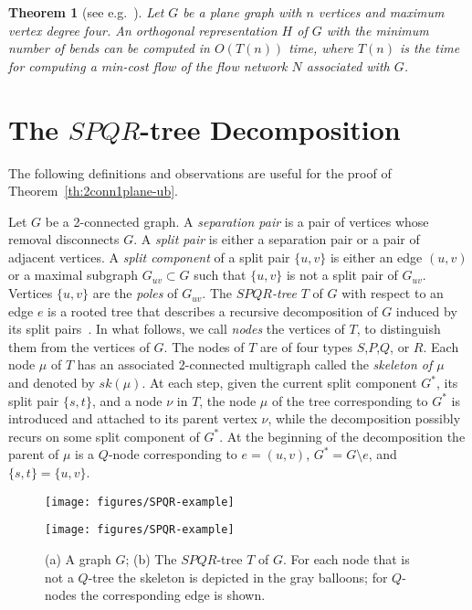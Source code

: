 \documentclass{article}
\newtheorem{theorem}{Theorem}
\begin{document}
\begin{theorem}[see e.g.~\cite{dett-gdavg-99}]
Let $G$ be a plane graph with $n$ vertices and maximum vertex degree four. An orthogonal representation $H$ of $G$ with the minimum number of bends can be computed in $O(T(n))$ time, where $T(n)$ is the time for computing a min-cost flow of the flow network $N$ associated with $G$.
\end{theorem}

\section{The $SPQR$-tree Decomposition}\label{ap:spqrtree}

The following definitions and observations are useful for the proof of Theorem~\ref{th:2conn1plane-ub}.


Let $G$ be a 2-connected graph.
A \emph{separation pair} is a pair of vertices whose removal disconnects $G$.
A \emph{split pair} is either a separation pair or a pair of adjacent vertices.
A \emph{split component} of a split pair $\{u,v\}$ is either an edge $(u,v)$ or a maximal subgraph $G_{uv} \subset G$ such that $\{u,v\}$ is not a split pair of $G_{uv}$.
Vertices $\{u,v\}$ are the \emph{poles} of $G_{uv}$.
The \emph{$SPQR$-tree} $T$ of $G$ with respect to an edge $e$ is a rooted tree that describes a recursive decomposition of $G$ induced by its split pairs~\cite{DBLP:journals/siamcomp/BattistaT96}.
In what follows, we call \emph{nodes} the vertices of $T$, to distinguish them from the vertices of $G$.
The nodes of $T$ are of four types $S$,$P$,$Q$, or $R$.
Each node $\mu$ of $T$ has an associated 2-connected multigraph called the \emph{skeleton of $\mu$} and denoted by $sk(\mu)$.
At each step, given the current split component $G^*$, its split pair $\{s,t\}$, and a node $\nu$ in $T$, the node $\mu$ of the tree corresponding to $G^*$ is introduced and attached to its parent vertex $\nu$, while the decomposition possibly recurs on some split component of $G^*$.
At the beginning of the decomposition the parent of $\mu$ is a $Q$-node corresponding to $e=(u,v)$, $G^* = G \setminus e$, and $\{s,t\} = \{u,v\}$.

\begin{figure}
\centering
\begin{minipage}[b]{.3\textwidth}
    	\centering
    	\texttt{[image: figures/SPQR-example]}
    	\subcaption{}\label{fi:SPQR-example.1}
    \end{minipage}
    \begin{minipage}[b]{.65\textwidth}
    	\centering
    	\texttt{[image: figures/SPQR-example]}
    	\subcaption{}\label{fi:SPQR-example.2}
    \end{minipage}
\caption{\label{fi:SPQR-example}(a) A graph $G$; (b) The $SPQR$-tree $T$ of $G$. For each node that is not a $Q$-tree the skeleton is depicted in the gray balloons; for $Q$-nodes the corresponding edge is shown.}
\end{figure}
\end{document}
